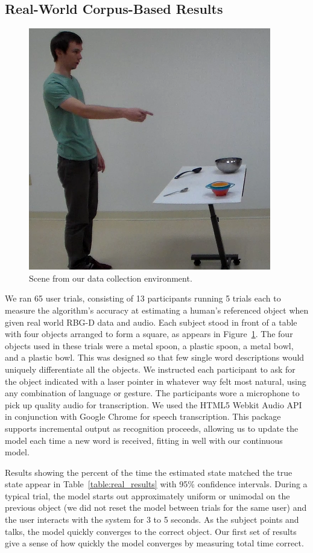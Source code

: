 \documentclass[a4paper, 11pt]{article} %
\begin{document}
\subsection{Real-World Corpus-Based Results}
\begin{figure}
\centering
\includegraphics[width=0.5\linewidth]{images/dataset.png}
\caption{Scene from our data collection environment.\label{fig:corpus_scene}}
\end{figure}

We ran 65 user trials, consisting of 13 participants running 5 trials each to measure the algorithm's accuracy at estimating a human's referenced object when given real world RBG-D data and audio. Each subject stood in front of a table with four objects arranged to form a square, as appears in Figure~\ref{fig:corpus_scene}. The four objects used in these trials were a metal spoon, a plastic spoon, a metal bowl, and a plastic bowl. This was designed so that few single word descriptions would uniquely differentiate all the objects. We instructed each participant to ask for the object indicated with a laser pointer in whatever way felt most natural, using any combination of language or gesture. The participants wore a microphone to pick up quality audio for transcription. We used the HTML5 Webkit Audio API in conjunction with Google Chrome for speech transcription. This package supports incremental output as recognition proceeds, allowing us to update the model each time a new word is received, fitting in well with our continuous model.

Results showing the percent of the time the estimated state matched the true state appear in Table~\ref{table:real_results} with 95\% confidence intervals. During a typical trial, the model starts out approximately uniform or unimodal on the previous object (we did not reset the model between trials for the same user) and the user interacts with the system for 3 to 5 seconds. As the subject points and talks, the model quickly converges to the correct object. Our first set of results give a sense of how quickly the model converges by measuring total time correct.
\end{document}
